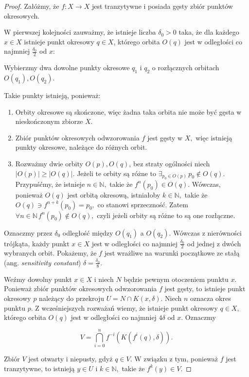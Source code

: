 \documentclass[licencjacka]{pwr_wmat_praca_dyplomowa}
\theoremstyle{plain}
\numberwithin{theorem}{chapter}
\theoremstyle{definition}
\numberwithin{theorem}{chapter}
\begin{document}
\begin{proof}
\cite{onDeveneyDefinitionOfChaos}
Załóżmy, że $f: X \rightarrow X$ jest tranzytywne i posiada gęsty zbiór punktów okresowych.

W pierwszej kolejności zauważmy, że istnieje liczba $\delta_0 > 0$ taka, że dla każdego $x \in X$ istnieje punkt okresowy $q \in X$, którego orbita $O(q)$ jest w odległości co najmniej $\frac{\delta_0}{2}$ od $x$: 

Wybierzmy dwa dowolne punkty okresowe $q_1$ i $q_2$ o rozłącznych orbitach $O(q_1), O(q_2)$. 


Takie punkty istnieją, ponieważ:
\begin{enumerate}
\item Orbity okresowe są skończone, więc żadna taka orbita nie może być gęsta w nieskończonym zbiorze $X.$
\item Zbiór punktów okresowych odwzorowania $f$ jest gęsty w $X,$ więc istnieją punkty okresowe, należące do różnych orbit.
\item Rozważmy dwie orbity $O(p), O(q)$, bez straty ogólności niech $|O(p)| \geq |O(q)|$. Jeżeli te orbity są różne to $\exists_{p_0 \in O(p)} \, p_0 \notin O(q).$ Przypuśćmy, że istnieje $n \in \mathbb{N},$ takie że $f^n(p_0) \in O(q).$ Wówczas, ponieważ $O(q)$ jest orbitą okresową, istniałoby $k \in \mathbb{N},$ takie że $O(q) \ni f^{n+k}(p_0) = p_0,$ co stanowi sprzeczność. Zatem $\forall{n \in \mathbb{N}} \, f^n(p_0) \notin O(q),$ czyli jeżeli orbity są różne to są one rozłączne.
\end{enumerate}


Oznaczmy przez $\delta_0$ odległość między $O(q_1)$ a $O(q_2)$. Wówczas z nierówności trójkąta, każdy punkt $x \in X$ jest w odległości co najmniej $\frac{\delta_0}{2}$ od  jednej z dwóch wybranych orbit.
Pokażemy, że $f$ jest wrażliwe na warunki początkowe ze stałą (ang. \textit{sensitivity constant}) $\delta = \frac{\delta_0}{8}.$

Weźmy dowolny punkt $x \in X$ i niech $N$ będzie pewnym otoczeniem punktu $x$. Ponieważ zbiór punktów okresowych odwzorowania $f$ jest gęsty, to istnieje punkt okresowy $p$ należący do przekroju $U = N \cap K(x, \delta)$. Niech $n$ oznacza okres punktu $p$. Z wcześniejszych rozważań wiemy, że istnieje punkt okresowy $q \in X$, którego orbita $O(q)$ jest w odległości co najmniej $4\delta$ od $x$. Oznaczmy

$$V = \bigcap_{i=0}^n f^{-i}(K(f^i(q), \delta)).$$

Zbiór $V$ jest otwarty i niepusty, gdyż $q \in V.$ W związku z tym, ponieważ $f$ jest tranzytywne, to istnieją $y \in U$ i $k \in \mathbb{N},$ takie że $f^k(y) \in V$.


\end{proof}
\end{document}
